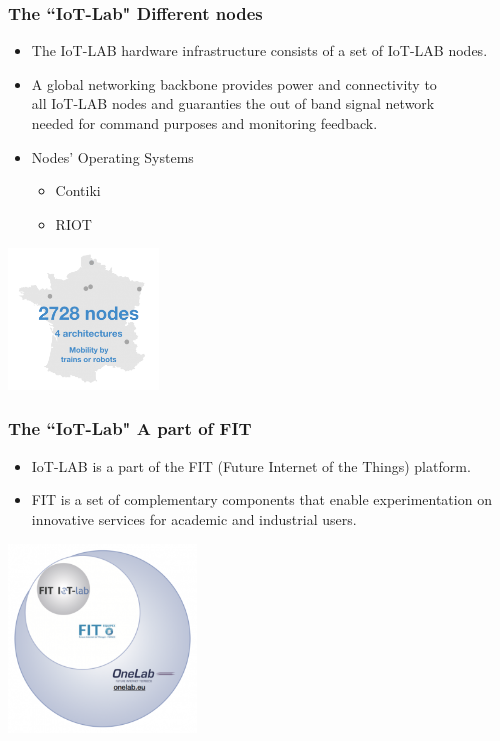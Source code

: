 \documentclass{beamer}
\begin{document}
\begin{frame}
	\frametitle{The ``IoT-Lab" Different nodes}
	\vspace{.1cm}
	\begin{itemize}
		\item The IoT-LAB hardware infrastructure consists of a set of IoT-LAB nodes.
		\item A global networking backbone provides power and connectivity to\\
		all IoT-LAB nodes and guaranties the out of band signal network\\
		needed for command purposes and monitoring feedback.
		\item Nodes' Operating Systems
		\begin{itemize}
			\item Contiki
			\item RIOT
		\end{itemize}
	\end{itemize}
	\vspace{.5cm}
	\hspace*{5.5cm} \includegraphics[width=4cm]{figs/iot-lab-2.png}
\end{frame}

\begin{frame}
	\frametitle{The ``IoT-Lab" A part of FIT}
	\vspace{.1cm}
	\begin{itemize}
		\item IoT-LAB is a part of the FIT (Future Internet of the Things) platform.
		\item FIT is a set of complementary components that enable experimentation
		on innovative services for academic and industrial users.
	\end{itemize}
	\vspace{.5cm}
	\hspace*{5.5cm} \includegraphics[width=5cm]{figs/iot-lab-4.png}
\end{frame}
\end{document}
